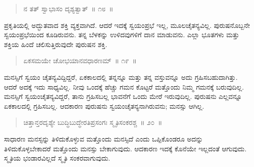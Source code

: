 \begin{verse}
ನ ತತ್​ ಸ್ವಾಭಾಸಂ ದೃಶ್ಯತ್ವಾತ್​~॥ ೧೮~॥
\end{verse}

\vspace{-0.43cm}


\vspace{0.1cm}

ಪ್ರಕೃತಿಯಲ್ಲಿ ಅದ್ಭುತವಾದ ಶಕ್ತಿ ವ್ಯಕ್ತವಾಗಿದೆ. ಆದರೆ ಇದಕ್ಕೆ ಸ್ವಯಂಪ್ರಭೆ ಇಲ್ಲ, ಮೂಲಚೈತನ್ಯವಿಲ್ಲ. ಪುರುಷನೊಬ್ಬನೇ ಸ್ವಯಂಪ್ರಭೆಯಿಂದ ಕೂಡಿರುವನು. ತನ್ನ ಬೆಳಕನ್ನು ಉಳಿದವುಗಳಿಗೆ ದಾನ ಮಾಡುವನು. ಎಲ್ಲಾ ಭೂತಗಳು ಮತ್ತು ಶಕ್ತಿಯ ಹಿಂದೆ ಚಲಿಸುತ್ತಿರುವುದೇ ಪುರುಷನ ಶಕ್ತಿ. 

\vspace{-0.3cm}

\begin{verse}
ಏಕಸಮಯೇ ಚೋಭಯಾನವಧಾರಣಮ್​~॥ ೧೯~॥
\end{verse}

\vspace{-0.43cm}


\vspace{0.2cm}

ಮನಸ್ಸಿಗೆ ಸ್ವಯಂ ಚೈತನ್ಯವಿದ್ದಿದ್ದರೆ, ಏಕಕಾಲದಲ್ಲಿ ತನ್ನನ್ನೂ ಮತ್ತು ತನ್ನ ವಸ್ತುವನ್ನೂ ಅದು ಗ್ರಹಿಸಬಹುದಾಗಿತ್ತು. ಆದರೆ ಅದಕ್ಕೆ ಇದು ಸಾಧ್ಯವಿಲ್ಲ. ನೀವು ಒಂದಕ್ಕೆ ಹೆಚ್ಚು ಗಮನ ಕೊಟ್ಟರೆ ಮತ್ತೊಂದು ನಿಮ್ಮ ಗಮನಕ್ಕೆ ಬರುವುದಿಲ್ಲ. ಮನಸ್ಸಿಗೆ ಸ್ವಯಂಚೈತನ್ಯವಿದ್ದರೆ, ತಾನು ಗ್ರಹಿಸಬಲ್ಲ ಭಾವನೆಗೆ ಒಂದು ಮೇರೆ ಇರುವುದಿಲ್ಲ. ಪುರುಷನು ಎಲ್ಲವನ್ನೂ ಏಕಕಾಲದಲ್ಲಿ ಗ್ರಹಿಸಬಲ್ಲ. ಆದಕಾರಣ ಪುರುಷನು ಸ್ವಯಂಚೈತನ್ಯನಾಗಿರುವನು; ಮನಸ್ಸು ಆಗಿಲ್ಲ. 

\vspace{-0.2cm}

\begin{verse}
ಚಿತ್ತಾನ್ತರದೃಶ್ಯೇ ಬುದ್ಧಿಬುದ್ಧೇರತಿಪ್ರಸಂಗಃ ಸ್ಮೃತಿಸಂಕರಶ್ಚ~॥ ೨೦~॥
\end{verse}

\vspace{-0.4cm}


\vspace{0.2cm}

ಸಾಧಾರಣ ಮನಸ್ಸನ್ನು ತಿಳಿದುಕೊಳ್ಳುವ ಮತ್ತೊಂದು ಮನಸ್ಸಿದೆ ಎಂದು ಒಪ್ಪಿಕೊಂಡರೂ ಅದನ್ನು ತಿಳಿದುಕೊಳ್ಳಬೇಕಾದರೆ ಮತ್ತೊಂದು ಮನಸ್ಸು ಬೇಕಾಗುವುದು. ಆದಕಾರಣ ಇದಕ್ಕೆ ಕೊನೆಯೇ ಇಲ್ಲದಂತೆ ಆಗುವುದು. ಸ್ಮೃತಿಯ ಭಂಡಾರವಿಲ್ಲದೆ ಸ್ಮೃತಿ ಸಂಕರವಾಗುವುದು. 

